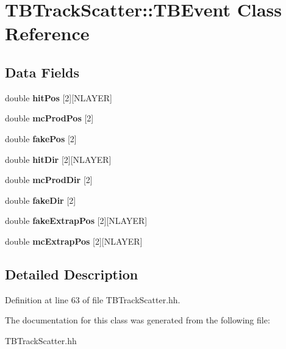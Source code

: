 \section{TBTrackScatter::TBEvent Class Reference}
\label{classTBTrackScatter_1_1TBEvent}
\subsection*{Data Fields}
\begin{DoxyCompactItemize}
\item 
double {\bfseries hitPos} [2][NLAYER]\label{classTBTrackScatter_1_1TBEvent_a52e8168b36764a718e4fe6c0ad132951}

\item 
double {\bfseries mcProdPos} [2]\label{classTBTrackScatter_1_1TBEvent_acb19b8e5107a14348b0900faf9de9037}

\item 
double {\bfseries fakePos} [2]\label{classTBTrackScatter_1_1TBEvent_ad2224c9b948a99a94923b57b71e709b3}

\item 
double {\bfseries hitDir} [2][NLAYER]\label{classTBTrackScatter_1_1TBEvent_ae11e105e2f208225844097be44c2209f}

\item 
double {\bfseries mcProdDir} [2]\label{classTBTrackScatter_1_1TBEvent_a6b0ad06b6859dfa4d3b33ce6ceab37ed}

\item 
double {\bfseries fakeDir} [2]\label{classTBTrackScatter_1_1TBEvent_ab9a7089d86050e755f701ca3c9a530ad}

\item 
double {\bfseries fakeExtrapPos} [2][NLAYER]\label{classTBTrackScatter_1_1TBEvent_aead73b11610a89b2bec00b298d2c4a54}

\item 
double {\bfseries mcExtrapPos} [2][NLAYER]\label{classTBTrackScatter_1_1TBEvent_a51446ed1379b77dd2bda8d177886fede}

\end{DoxyCompactItemize}


\subsection{Detailed Description}


Definition at line 63 of file TBTrackScatter.hh.

The documentation for this class was generated from the following file:\begin{DoxyCompactItemize}
\item 
TBTrackScatter.hh\end{DoxyCompactItemize}
